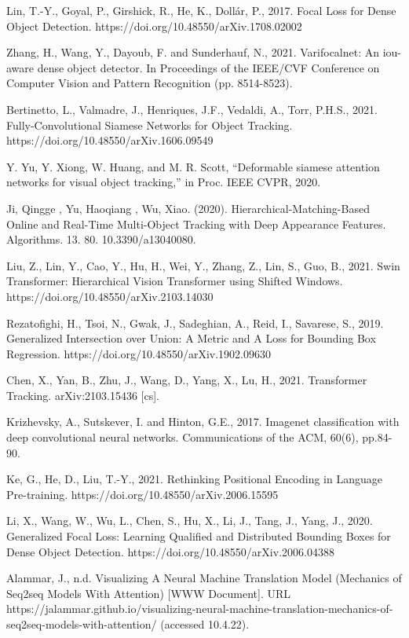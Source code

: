 \begin{thebibliography}{ widest-label }
	Lin, T.-Y., Goyal, P., Girshick, R., He, K., Dollár, P., 2017. Focal Loss for Dense Object Detection. https://doi.org/10.48550/arXiv.1708.02002
	
	Zhang, H., Wang, Y., Dayoub, F. and Sunderhauf, N., 2021. Varifocalnet: An iou-aware dense object detector. In Proceedings of the IEEE/CVF Conference on Computer Vision and Pattern Recognition (pp. 8514-8523).
	
	Bertinetto, L., Valmadre, J., Henriques, J.F., Vedaldi, A., Torr, P.H.S., 2021. Fully-Convolutional Siamese Networks for Object Tracking. https://doi.org/10.48550/arXiv.1606.09549
	
	Y. Yu, Y. Xiong, W. Huang, and M. R. Scott, “Deformable siamese attention networks for visual object tracking,” in Proc. IEEE CVPR, 2020.
	
	Ji, Qingge , Yu, Haoqiang , Wu, Xiao. (2020). Hierarchical-Matching-Based Online and Real-Time Multi-Object Tracking with Deep Appearance Features. Algorithms. 13. 80. 10.3390/a13040080. 
	
	Liu, Z., Lin, Y., Cao, Y., Hu, H., Wei, Y., Zhang, Z., Lin, S., Guo, B., 2021. Swin Transformer: Hierarchical Vision Transformer using Shifted Windows. https://doi.org/10.48550/arXiv.2103.14030
	
	Rezatofighi, H., Tsoi, N., Gwak, J., Sadeghian, A., Reid, I., Savarese, S., 2019. Generalized Intersection over Union: A Metric and A Loss for Bounding Box Regression. https://doi.org/10.48550/arXiv.1902.09630
	
	Chen, X., Yan, B., Zhu, J., Wang, D., Yang, X., Lu, H., 2021. Transformer Tracking. arXiv:2103.15436 [cs].
	
	Krizhevsky, A., Sutskever, I. and Hinton, G.E., 2017. Imagenet classification with deep convolutional neural networks. Communications of the ACM, 60(6), pp.84-90.
	
	Ke, G., He, D., Liu, T.-Y., 2021. Rethinking Positional Encoding in Language Pre-training. https://doi.org/10.48550/arXiv.2006.15595
	
	Li, X., Wang, W., Wu, L., Chen, S., Hu, X., Li, J., Tang, J., Yang, J., 2020. Generalized Focal Loss: Learning Qualified and Distributed Bounding Boxes for Dense Object Detection. https://doi.org/10.48550/arXiv.2006.04388
	
	Alammar, J., n.d. Visualizing A Neural Machine Translation Model (Mechanics of Seq2seq Models With Attention) [WWW Document]. URL https://jalammar.github.io/visualizing-neural-machine-translation-mechanics-of-seq2seq-models-with-attention/ (accessed 10.4.22).



\end{thebibliography}
